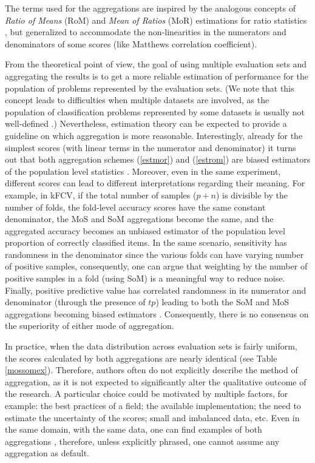 \documentclass[5p, final]{elsarticle}
\begin{document}
The terms used for the aggregations are inspired by the analogous concepts of \emph{Ratio of Means} (RoM) and \emph{Mean of Ratios} (MoR) estimations for ratio statistics \cite{rommor, rommor2}, but generalized to accommodate the non-linearities in the numerators and denominators of some scores (like Matthews correlation coefficient).

From the theoretical point of view, the goal of using multiple evaluation sets and aggregating the results is to get a more reliable estimation of performance for the population of problems represented by the evaluation sets. (We note that this concept leads to difficulties when multiple datasets are involved, as the population of classification problems represented by some datasets is usually not well-defined \cite{nfl}.) Nevertheless, estimation theory \cite{estimationtheory} can be expected to provide a guideline on which aggregation is more reasonable. Interestingly, already for the simplest scores (with linear terms in the numerator and denominator) it turns out that both aggregation schemes (\ref{estmor}) and (\ref{estrom}) are biased estimators of the population level statistics \cite{rommor2}. Moreover, even in the same experiment, different scores can lead to different interpretations regarding their meaning. For example, in kFCV, if the total number of samples ($p + n$) is divisible by the number of folds, the fold-level accuracy scores have the same constant denominator, the MoS and SoM aggregations become the same, and the aggregated accuracy becomes an unbiased estimator of the population level proportion of correctly classified items. In the same scenario, sensitivity has randomness in the denominator since the various folds can have varying number of positive samples, consequently, one can argue that weighting by the number of positive samples in a fold (using SoM) is a meaningful way to reduce noise. Finally, positive predictive value has correlated randomness in its numerator and denominator (through the presence of $tp$) leading to both the SoM and MoS aggregations becoming biased estimators \cite{rommor2}. Consequently, there is no consensus on the superiority of either mode of aggregation.

In practice, when the data distribution across evaluation sets is fairly uniform, the scores calculated by both aggregations are nearly identical (see Table \ref{mossomex}). Therefore, authors often do not explicitly describe the method of aggregation, as it is not expected to significantly alter the qualitative outcome of the research. A particular choice could be motivated by multiple factors, for example: the best practices of a field; the available implementation; the need to estimate the uncertainty of the scores; small and imbalanced data, etc. Even in the same domain, with the same data, one can find examples of both aggregations \cite{vessel}, therefore, unless explicitly phrased, one cannot assume any aggregation as default.
\end{document}

